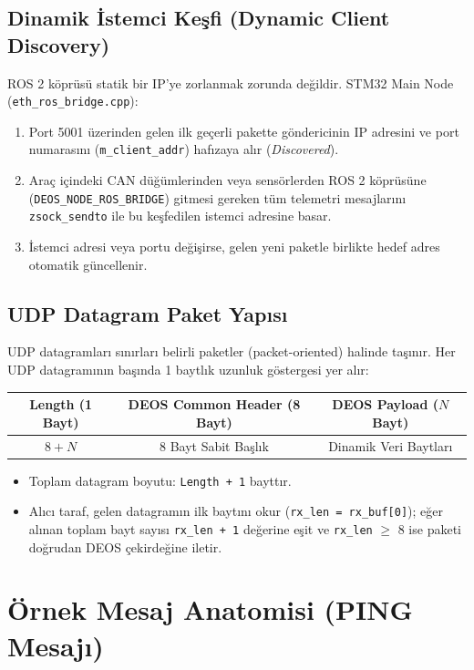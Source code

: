 \documentclass[a4paper,10pt]{article}
\newcommand{\code}[1]{\texttt{#1}}
\begin{document}
\subsection{Dinamik İstemci Keşfi (Dynamic Client Discovery)}
ROS 2 köprüsü statik bir IP'ye zorlanmak zorunda değildir. STM32 Main Node (\code{eth\_ros\_bridge.cpp}):
\begin{enumerate}
    \item Port 5001 üzerinden gelen ilk geçerli pakette göndericinin IP adresini ve port numarasını (\code{m\_client\_addr}) hafızaya alır (\textit{Discovered}).
    \item Araç içindeki CAN düğümlerinden veya sensörlerden ROS 2 köprüsüne (\code{DEOS\_NODE\_ROS\_BRIDGE}) gitmesi gereken tüm telemetri mesajlarını \code{zsock\_sendto} ile bu keşfedilen istemci adresine basar.
    \item İstemci adresi veya portu değişirse, gelen yeni paketle birlikte hedef adres otomatik güncellenir.
\end{enumerate}

\subsection{UDP Datagram Paket Yapısı}
UDP datagramları sınırları belirli paketler (packet-oriented) halinde taşınır. Her UDP datagramının başında 1 baytlık uzunluk göstergesi yer alır:

\begin{table}[h]
\centering
\begin{tabular}{|c|c|c|}
\hline
\textbf{Length (1 Bayt)} & \textbf{DEOS Common Header (8 Bayt)} & \textbf{DEOS Payload ($N$ Bayt)} \\
\hline
$8 + N$ & 8 Bayt Sabit Başlık & Dinamik Veri Baytları \\
\hline
\end{tabular}
\end{table}

\begin{itemize}
    \item Toplam datagram boyutu: \code{Length + 1} bayttır.
    \item Alıcı taraf, gelen datagramın ilk baytını okur (\code{rx\_len = rx\_buf[0]}); eğer alınan toplam bayt sayısı \code{rx\_len + 1} değerine eşit ve \code{rx\_len} $\ge$ 8 ise paketi doğrudan DEOS çekirdeğine iletir.
\end{itemize}

\section{Örnek Mesaj Anatomisi (PING Mesajı)}
\end{document}
